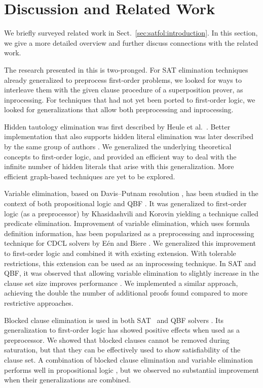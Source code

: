 \section{Discussion and Related Work}
\label{sec:satfol:discussion-and-related-work}

We briefly surveyed related work in Sect.~\ref{sec:satfol:introduction}. In this
section, we give a more detailed overview and further discuss connections with
the related work.

The research presented in this \paper{} is two-pronged. For SAT elimination
techniques already generalized to preprocess first-order problems, we looked for
ways to interleave them with the given clause procedure of a superposition
prover, as inprocessing. For techniques that had not yet been ported to
first-order logic, we looked for generalizations that allow both preprocessing and
inprocessing.

Hidden tautology elimination was first described
by Heule et al.\ \cite{hjb-2010-cl-elim}. Better implementation that also
supports hidden literal elimination was later described by the same group of
authors \cite{hjb-2011-big-simplification}. We generalized the underlying
theoretical concepts to first-order logic, and provided an efficient way to deal
with the infinite number of hidden literals that arise  with this
generalization. More efficient graph-based techniques are yet to be explored.

Variable elimination, based on Davis--Putnam resolution \cite{dp-60-dp}, has been studied in
the context of both propositional logic \cite{sp-04-niver,cs-00-zres} and QBF
\cite{ab-2004-re}. It was generalized to first-order logic (as a
preprocessor) by Khasidashvili and Korovin \cite{kk-2016-pe-fol} yielding a technique called
predicate elimination. Improvement of variable elimination,
which uses formula definition information, has been popularized as a preprocessing and
inprocessing technique for CDCL solvers by E{\'{e}}n and Biere
\cite{eb-2005-satpreprocess}. We generalized this improvement to first-order
logic and combined it with existing extension. With tolerable restrictions,
this extension can be used as an inprocessing technique. In SAT and QBF, it was observed that
allowing variable elimination to slightly increase in the clause set size
improves performance \cite{bls-11-bloqqer}. We implemented a similar approach,
achieving the double the number of additional proofs found compared to more
restrictive approaches.

Blocked clause elimination is used in both SAT~\cite{jbh-10-BCE} and QBF
solvers \cite{bls-11-bloqqer}. Its generalization to first-order logic
\cite{ksstb-2017-blockedfol} has showed positive effects when used as a
preprocessor. We showed that blocked clauses cannot be removed during
saturation, but that they can be effectively used to show satisfiability of the
clause set. A combination of blocked clause elimination and
variable elimination performs well in propositional logic \cite{jbh-10-BCE}, but we observed no substantial
improvement when their generalizations are combined.


